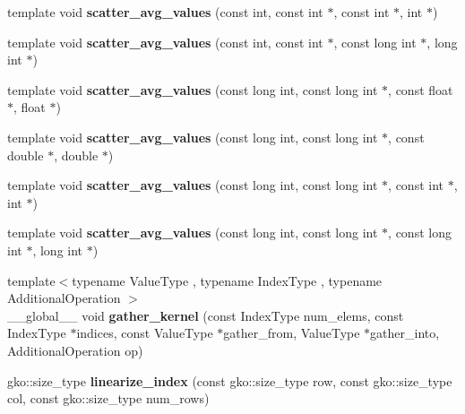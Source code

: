 \begin{DoxyCompactItemize}
\item 
\mbox{\label{namespaceschwz_ac473f48d68800895d95bb377496827a8}} 
template void {\bfseries scatter\+\_\+avg\+\_\+values} (const int, const int $\ast$, const int $\ast$, int $\ast$)
\item 
\mbox{\label{namespaceschwz_a26eb04ab096688b4ad522fef0eab204e}} 
template void {\bfseries scatter\+\_\+avg\+\_\+values} (const int, const int $\ast$, const long int $\ast$, long int $\ast$)
\item 
\mbox{\label{namespaceschwz_ac104918c72369958d827881200e6b0f2}} 
template void {\bfseries scatter\+\_\+avg\+\_\+values} (const long int, const long int $\ast$, const float $\ast$, float $\ast$)
\item 
\mbox{\label{namespaceschwz_a7857bd3c6d5819613725a25e46c8fb2c}} 
template void {\bfseries scatter\+\_\+avg\+\_\+values} (const long int, const long int $\ast$, const double $\ast$, double $\ast$)
\item 
\mbox{\label{namespaceschwz_a0c7a01a33460207f5c3d063ef9eb015a}} 
template void {\bfseries scatter\+\_\+avg\+\_\+values} (const long int, const long int $\ast$, const int $\ast$, int $\ast$)
\item 
\mbox{\label{namespaceschwz_aba9e74f2b7d99cfe0e27bb1577e61331}} 
template void {\bfseries scatter\+\_\+avg\+\_\+values} (const long int, const long int $\ast$, const long int $\ast$, long int $\ast$)
\item 
\mbox{\label{namespaceschwz_a5e68ca208e6176c2ba8f7da99786bd75}} 
{\footnotesize template$<$typename Value\+Type , typename Index\+Type , typename Additional\+Operation $>$ }\\\+\_\+\+\_\+global\+\_\+\+\_\+ void {\bfseries gather\+\_\+kernel} (const Index\+Type num\+\_\+elems, const Index\+Type $\ast$indices, const Value\+Type $\ast$gather\+\_\+from, Value\+Type $\ast$gather\+\_\+into, Additional\+Operation op)
\item 
\mbox{\label{namespaceschwz_a443a272fc6c66825dc7a958e824e32e3}} 
gko\+::size\+\_\+type {\bfseries linearize\+\_\+index} (const gko\+::size\+\_\+type row, const gko\+::size\+\_\+type col, const gko\+::size\+\_\+type num\+\_\+rows)

\end{DoxyCompactItemize}
